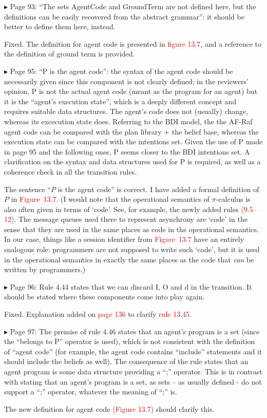 \documentclass{article}
\newcommand*\R[1]{\textcolor{red}{#1}} %
\newenvironment{them}%
  {\bigskip\noindent\begingroup\color{blue}$\blacktriangleright$\enspace}%
  {\endgroup\par}
\begin{document}
\begin{them}
Page 93:
``The sets AgentCode and GroundTerm are not defined here, but the definitions
can be easily recovered from the abstract grammar'': it should be better to
define them here, instead.
\end{them}
Fixed. The definition for agent code is presented in \R{figure 13.7}, and a
reference to the definition of ground term is provided.

\begin{them}
Page 95:
``P is the agent code'': the syntax of the agent code should be necessarily given
since this component is not clearly defined; in the reviewers' opinion, P is
not the actual agent code (meant as the program for an agent) but it is the
``agent's execution state'', which is a deeply different concept and requires
suitable data structures. The agent's code does not (usually) change, whereas
its excecution state does. Referring to the BDI model, the the AF-Raf agent
code can be compared with the plan library + the belief base, whereas the
execution state can be compared with the intentions set. Given the use of P
made in page 95 and the following ones, P seems closer to the BDI intentions
set. A clarification on the syntax and data structures used for P is required,
as well as a coherence check in all the transition rules.
\end{them}
The sentence ``$P$ is the agent code'' is correct.
I have added a formal definition of $P$ in \R{Figure~13.7}.
(I would note that the operational semantics of $\pi$-calculus is also
  often given in terms of `code'.
See, for example, the newly added rules \R{(9.5--12)}.
The message queues used there to represent asynchrony are `code'
  in the sense that they are used in the same places as code in the operational semantics.
In our case, things like a session identifier from \R{Figure~13.7}
  have an entirely snalogous role:
  programmers are not supposed to write such `code',
  but it is used in the operational semantics in exactly the same
    places as the code that \emph{can} be written by programmers.)


\begin{them}
Page 96:
Rule 4.44 states that we can discard I, O and d in the transition. It should be
stated where these components come into play again.
\end{them}
Fixed. Explanation added on \R{page 136} to clarify \R{rule 13.45}.

\begin{them}
Page 97:
The premise of rule 4.46 states that an agent's program is a set (since the
``belongs to P'' operator is used), which is not consistent with the definition
of ``agent code'' (for example, the agent code contains ``include'' statements and
it should include the beliefs as well). The consequence of the rule states that
an agent program is some data structure providing a ``;'' operator. This is in
contrast with stating that an agent's program is a set, as sets – as usually
defined - do not support a ``;'' operator, whatever the meaning of ``;'' is.
\end{them}
The new definition for agent code \R{(Figure 13.7)} should clarify this.
\end{document}
